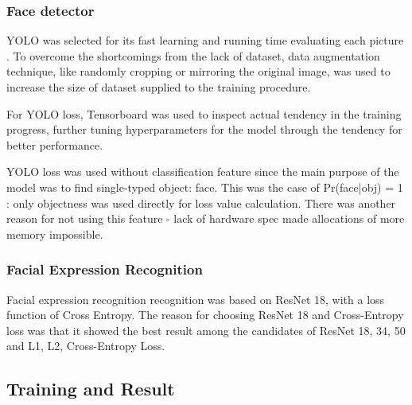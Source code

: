 \documentclass{article}
\begin{document}
\subsubsection{Face detector}
YOLO was selected for its fast learning and running time evaluating each picture
\cite{redmon2018yolov3}. To overcome the shortcomings from the lack of dataset,
data augmentation technique, like randomly cropping or mirroring the original
image, was used to increase the size of dataset supplied to the training
procedure.

For YOLO loss, Tensorboard was used to inspect actual tendency in the training
progress, further tuning hyperparameters for the model through the tendency for
better performance.


YOLO loss was used without classification feature since the main purpose of the
model was to find single-typed object: face. This was the case of Pr(face|obj) =
1 : only objectness was used directly for loss value calculation. There was
another reason for not using this feature - lack of hardware spec made
allocations of more memory impossible.

\subsubsection{Facial Expression Recognition}
Facial expression recognition recognition was based on ResNet
18\cite{DBLP:journals/corr/HeZRS15}, with a loss function of Cross Entropy. The
reason for choosing ResNet 18 and Cross-Entropy loss was that it showed the best
result among the candidates of ResNet 18, 34, 50 and L1, L2, Cross-Entropy Loss.

\subsection{Training and Result}
\end{document}
